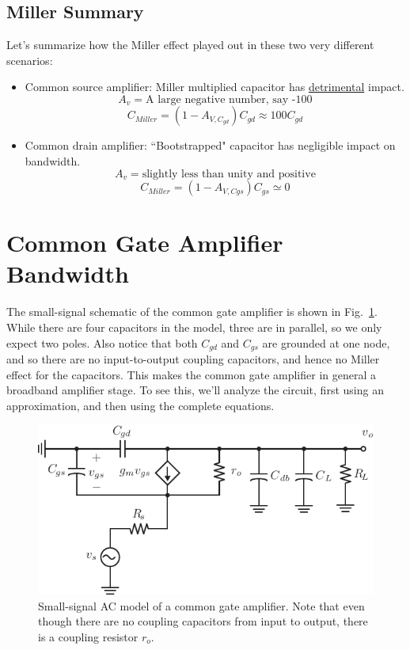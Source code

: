 \subsection{Miller Summary}
Let's summarize how the Miller effect played out in these two very different scenarios:
\begin{itemize}
\item Common source amplifier:  Miller multiplied capacitor has \underline{detrimental} impact.
\[
	A_v = \text{A large negative number, say -100} 
\]
\[	
	{C_{Miller}} = (1 - {A_{V,{C_{gd}}}}){C_{gd}} \approx 100{C_{gd}}
\]
\item Common drain amplifier:  ``Bootstrapped" capacitor has negligible impact on bandwidth.
\[
	A_v = \text{slightly less than unity and positive} 
\]
\[
	{C_{Miller}} = (1 - {A_{V,Cgs}}){C_{gs}} \simeq 0
\]
\end{itemize}
\section{Common Gate Amplifier Bandwidth}
The small-signal schematic of the common gate amplifier is shown in Fig.~\ref{fig:cg_amp_caps}. While there are four capacitors in the model, three are in parallel, so we only expect two poles.  Also notice that both $C_{gd}$ and $C_{gs}$ are grounded at one node, and so there are no input-to-output coupling capacitors, and hence no Miller effect for the capacitors.  This makes the common gate amplifier in general a broadband amplifier stage.  To see this, we'll analyze the circuit, first using an approximation, and then using the complete equations.  
\begin{figure}[tb]
\begin{center}
\includegraphics[scale=1]{amp_cg_ss}
\end{center}
\caption{Small-signal AC model of a common gate amplifier.  Note that even though there are no coupling capacitors from input to output, there is a coupling resistor $r_o$.}
\label{fig:cg_amp_caps}
\end{figure}

